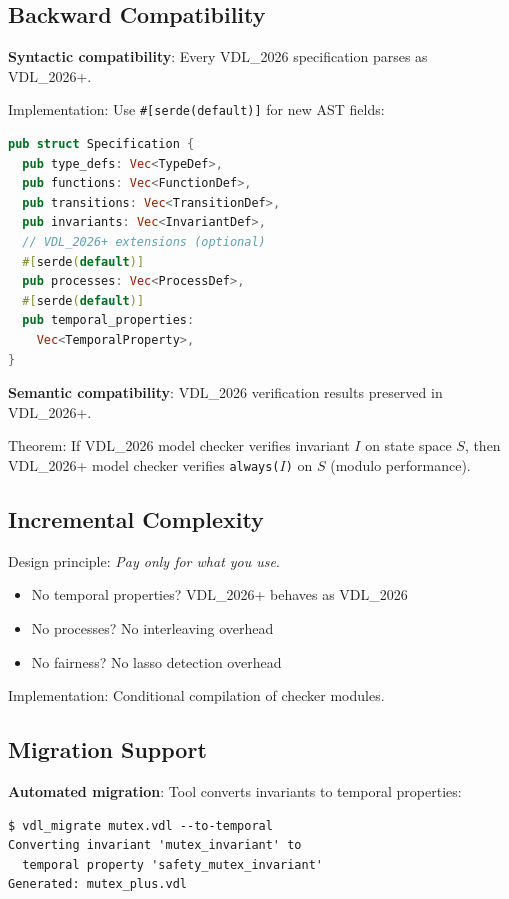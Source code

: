 \documentclass[conference]{IEEEtran}
\begin{document}
\subsection{Backward Compatibility}

\textbf{Syntactic compatibility}: Every VDL\_2026 specification parses as VDL\_2026+.

Implementation: Use \texttt{\#[serde(default)]} for new AST fields:

\begin{lstlisting}[language=Rust, caption={Backward-compatible AST}]
pub struct Specification {
  pub type_defs: Vec<TypeDef>,
  pub functions: Vec<FunctionDef>,
  pub transitions: Vec<TransitionDef>,
  pub invariants: Vec<InvariantDef>,
  // VDL_2026+ extensions (optional)
  #[serde(default)]
  pub processes: Vec<ProcessDef>,
  #[serde(default)]
  pub temporal_properties:
    Vec<TemporalProperty>,
}
\end{lstlisting}

\textbf{Semantic compatibility}: VDL\_2026 verification results preserved in VDL\_2026+.

Theorem: If VDL\_2026 model checker verifies invariant $I$ on state space $S$, then VDL\_2026+ model checker verifies \texttt{always($I$)} on $S$ (modulo performance).

\subsection{Incremental Complexity}

Design principle: \textit{Pay only for what you use}.

\begin{itemize}
\item No temporal properties? VDL\_2026+ behaves as VDL\_2026
\item No processes? No interleaving overhead
\item No fairness? No lasso detection overhead
\end{itemize}

Implementation: Conditional compilation of checker modules.

\subsection{Migration Support}

\textbf{Automated migration}: Tool converts invariants to temporal properties:

\begin{verbatim}
$ vdl_migrate mutex.vdl --to-temporal
Converting invariant 'mutex_invariant' to
  temporal property 'safety_mutex_invariant'
Generated: mutex_plus.vdl
\end{verbatim}
\end{document}
